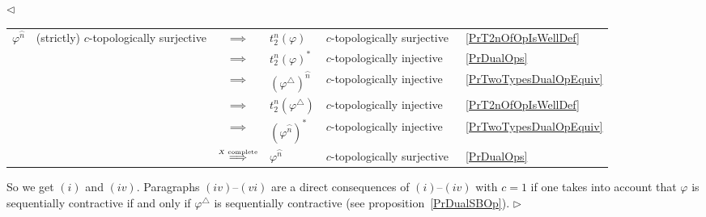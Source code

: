 \documentclass[12pt]{article}
\newenvironment{proof}{\par $\triangleleft$}{$\triangleright$}
\begin{document}
\begin{proof}
\begin{tabular}{llclll}
$\varphi^{\wideparen{n}}$                           & 
(strictly) $c$-topologically surjective             & 
$\implies$                                          & 
$t_2^n(\varphi)$                                    & 
$c$-topologically surjective                        &
~\ref{PrT2nOfOpIsWellDef}                           \\
                                                    &
                                                    & 
$\implies$                                          &
${t_2^n(\varphi)}^*$                                & 
$c$-topologically injective                         &
~\ref{PrDualOps}                                    \\
                                                    &
                                                    & 
$\implies$                                          & 
${(\varphi^\triangle)}^{\wideparen{n}}$             & 
$c$-topologically injective                         &
~\ref{PrTwoTypesDualOpEquiv}                        \\
                                                    &
                                                    &
$\implies$                                          & 
$t_2^n(\varphi^\triangle)$                          & 
$c$-topologically injective                         &
~\ref{PrT2nOfOpIsWellDef}                           \\
                                                    &
                                                    & 
$\implies$                                          & 
${(\varphi^{\wideparen{n}})}^*$                     & 
$c$-topologically injective                         &
~\ref{PrTwoTypesDualOpEquiv}                        \\
                                                    &
                                                    & 
$\overset{\mbox{\tiny{$X$ complete}}}{\implies}$ & 
$\varphi^{\wideparen{n}}$                           & 
$c$-topologically surjective                        &
~\ref{PrDualOps}                                    \\
\end{tabular}

So we get $(i)$ and $(iv)$. Paragraphs $(iv)$--$(vi)$ 
are a direct consequences of $(i)$--$(iv)$ with 
$c=1$ if one takes into account that $\varphi$ is sequentially contractive  if 
and only if  $\varphi^\triangle$ is sequentially contractive 
(see proposition~\ref{PrDualSBOp}).
\end{proof}
\end{document}
